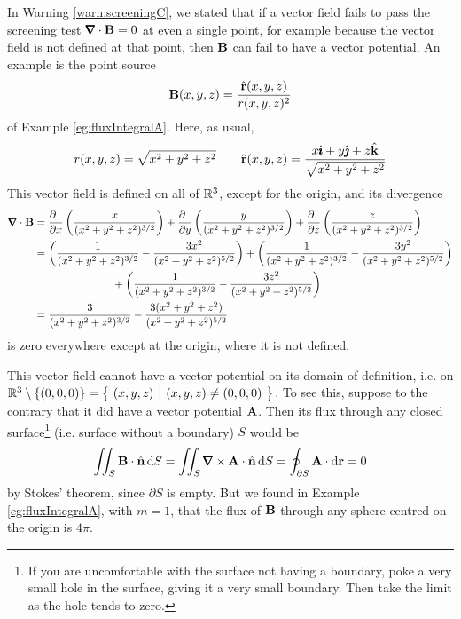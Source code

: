 \begin{eg}\label{eg:stokesE}
In Warning \ref{warn:screeningC}, we stated that if a vector field
fails to pass the screening test $\vnabla\cdot\vB=0$ at even a single 
point, for example because the vector field is not defined at that point, 
then $\mathbf{B}$ can fail to have a vector potential.
An example is the point source
\begin{equation*}
\mathbf{B}(x,y,z) = \frac{\hat{\mathbf{r}}(x,y,z)}{r(x,y,z)^2}
\end{equation*}
of Example \ref{eg:fluxIntegralA}. Here, as usual,
\begin{equation*}
r(x,y,z) = \sqrt{x^2+y^2+z^2}\qquad
\hat{\mathbf{r}}(x,y,z) = \frac{x\hat{\pmb{\imath}} + y\hat{\pmb{\jmath}} + z\hat{\mathbf{k}}}{\sqrt{x^2+y^2+z^2}}
\end{equation*}
This vector field is defined on all of $\mathbb{R}^3$, except for the origin, and
its divergence 
\begin{align*}
\vnabla\cdot\vB
&=\frac{\partial\hfill}{\partial x} \left(\frac{x}{(x^2+y^2+z^2)^{3/2}}\right)
  +\frac{\partial\hfill}{\partial y} \left(\frac{y}{(x^2+y^2+z^2)^{3/2}}\right)
  +\frac{\partial\hfill}{\partial z} \left(\frac{z}{(x^2+y^2+z^2)^{3/2}}\right)
\\
&=\left(\frac{1}{(x^2+y^2+z^2)^{3/2}}-\frac{3x^2}{(x^2+y^2+z^2)^{5/2}}\right)
+\left(\frac{1}{(x^2+y^2+z^2)^{3/2}}-\frac{3y^2}{(x^2+y^2+z^2)^{5/2}}\right)
\\&\hskip1in
+\left(\frac{1}{(x^2+y^2+z^2)^{3/2}}-\frac{3z^2}{(x^2+y^2+z^2)^{5/2}}\right)
\\
&=\frac{3}{(x^2+y^2+z^2)^{3/2}}-\frac{3(x^2+y^2+z^2)}{(x^2+y^2+z^2)^{5/2}}
\end{align*}
is zero everywhere except at the origin, where it is not defined.

This vector field cannot have a vector potential on its 
domain of definition, i.e. on
$
\mathbb{R}^3\setminus\{(0,0,0)\}
             =\big\{ \ (x,y,z)\ \big|\ (x,y,z)\ne(0,0,0)\ \big\}
$. To see this, suppose to the contrary that it did have a vector potential
$\mathbf{A}$. Then its flux through any closed surface\footnote{If you are uncomfortable with the surface not having a boundary, poke a very small hole
in the surface, giving it a very small boundary. Then take the limit as the hole tends to zero.} (i.e. surface without a boundary) $S$ would be
\begin{align*}
\dblInt_S\vB\cdot\hn\,\dee{S}
     = \dblInt_S\vnabla\times\vA\cdot\hn\,\dee{S}
     =\oint_{\partial S}\vA\cdot\dee{\vr}
     =0
\end{align*}
by Stokes' theorem, since $\partial S$ is empty. But we found in Example \ref{eg:fluxIntegralA}, 
with $m=1$, that the flux of $\mathbf{B}$ through any sphere centred on 
the origin is $4\pi$.

\end{eg}

